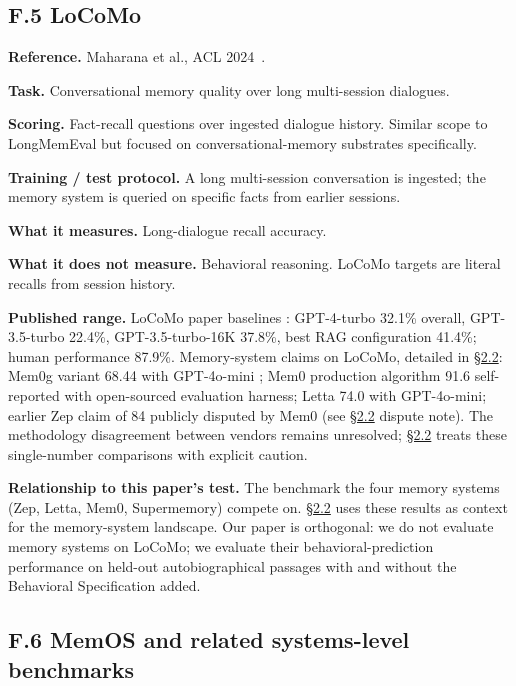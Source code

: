 \hypertarget{f.5-locomo}{%
\subsection{F.5 LoCoMo}\label{f.5-locomo}}

\textbf{Reference.} Maharana et al., ACL 2024~\citep{maharana2024locomo}.

\textbf{Task.} Conversational memory quality over long multi-session
dialogues.

\textbf{Scoring.} Fact-recall questions over ingested dialogue history.
Similar scope to LongMemEval but focused on conversational-memory
substrates specifically.

\textbf{Training / test protocol.} A long multi-session conversation is
ingested; the memory system is queried on specific facts from earlier
sessions.

\textbf{What it measures.} Long-dialogue recall accuracy.

\textbf{What it does not measure.} Behavioral reasoning. LoCoMo targets
are literal recalls from session history.

\textbf{Published range.} LoCoMo paper baselines \citep{maharana2024locomo}: GPT-4-turbo 32.1\% overall, GPT-3.5-turbo 22.4\%,
GPT-3.5-turbo-16K 37.8\%, best RAG configuration 41.4\%; human
performance 87.9\%. Memory-system claims on LoCoMo, detailed in \hyperref[memory-systems-for-llm-agents]{§2.2}:
Mem0g variant 68.44 with GPT-4o-mini \citep{chhikara2025mem0}; Mem0 production algorithm 91.6 self-reported with
open-sourced evaluation harness; Letta 74.0 with GPT-4o-mini; earlier
Zep claim of 84 publicly disputed by Mem0 (see \hyperref[memory-systems-for-llm-agents]{§2.2} dispute note). The
methodology disagreement between vendors remains unresolved; \hyperref[memory-systems-for-llm-agents]{§2.2} treats
these single-number comparisons with explicit caution.

\textbf{Relationship to this paper's test.} The benchmark the four
memory systems (Zep, Letta, Mem0, Supermemory) compete on. \hyperref[memory-systems-for-llm-agents]{§2.2} uses
these results as context for the memory-system landscape. Our paper is
orthogonal: we do not evaluate memory systems on LoCoMo; we evaluate
their behavioral-prediction performance on held-out autobiographical
passages with and without the Behavioral Specification added.

\hypertarget{f.6-memos-and-related-systems-level-benchmarks}{%
\subsection{F.6 MemOS and related systems-level
benchmarks}\label{f.6-memos-and-related-systems-level-benchmarks}}

